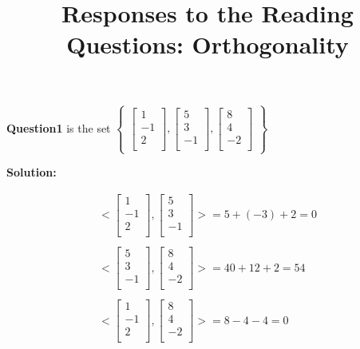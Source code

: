\documentclass{article}
\title{Responses to the Reading Questions: Orthogonality}
\begin{document}
\maketitle

\newcommand{\sol} {
  \textbf{Solution:}
}

\newcommand{\LIVHS} {\textbf{Linearly Independent Vectors and Homogeneous Systems}}

\newcommand{\FVCS} {\textbf{Free Variables for Consistent Systems}}

\newcommand{\HSC} {\textbf{Homogeneous Systems are Consistent}}

\newcommand{\ls} {\(\mathcal{LS}(A,\textbf{0})\)}

\newcommand{\p} {$\boxed{1}$~}

\newcommand{\QAA} {
\begin{bmatrix}
  1 \\
  -1 \\
  2 \\
\end{bmatrix}
}

\newcommand{\QAB} {
\begin{bmatrix}
  5 \\
  3 \\
  -1 \\
\end{bmatrix}
}

\newcommand{\QAC} {
\begin{bmatrix}
  8 \\
  4 \\
  -2 \\
\end{bmatrix}
}

\noindent\textbf{Question1} is the set
\(
\begin{Bmatrix}
  \QAA, \QAB, \QAC
\end{Bmatrix}
\)

\sol

\begin{equation}
  \begin{matrix}
    <\QAA, \QAB> = 5 + (-3) + 2 = 0 \\ \\
    <\QAB, \QAC> = 40 + 12 + 2 = 54 \\ \\
    <\QAA, \QAC> = 8 - 4 -4 = 0 \\ \\
  \end{matrix}
\end{equation}
\end{document}
